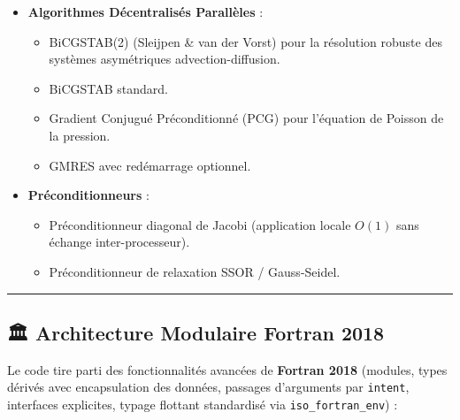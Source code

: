 \documentclass[
  french,
]{article}
\providecommand{\tightlist}{%
  \setlength{\itemsep}{0pt}\setlength{\parskip}{0pt}}
\begin{document}
\begin{itemize}
\tightlist
\item
  \textbf{Algorithmes Décentralisés Parallèles} :

  \begin{itemize}
  \tightlist
  \item
    BiCGSTAB(2) (Sleijpen \& van der Vorst) pour la résolution robuste
    des systèmes asymétriques advection-diffusion.
  \item
    BiCGSTAB standard.
  \item
    Gradient Conjugué Préconditionné (PCG) pour l'équation de Poisson de
    la pression.
  \item
    GMRES avec redémarrage optionnel.
  \end{itemize}
\item
  \textbf{Préconditionneurs} :

  \begin{itemize}
  \tightlist
  \item
    Préconditionneur diagonal de Jacobi (application locale \(O(1)\)
    sans échange inter-processeur).
  \item
    Préconditionneur de relaxation SSOR / Gauss-Seidel.
  \end{itemize}
\end{itemize}

\begin{center}\rule{0.5\linewidth}{0.5pt}\end{center}

\subsection{🏛 Architecture Modulaire Fortran
2018}\label{architecture-modulaire-fortran-2018}

Le code tire parti des fonctionnalités avancées de \textbf{Fortran 2018}
(modules, types dérivés avec encapsulation des données, passages
d'arguments par \texttt{intent}, interfaces explicites, typage flottant
standardisé via \texttt{iso\_fortran\_env}) :
\end{document}
